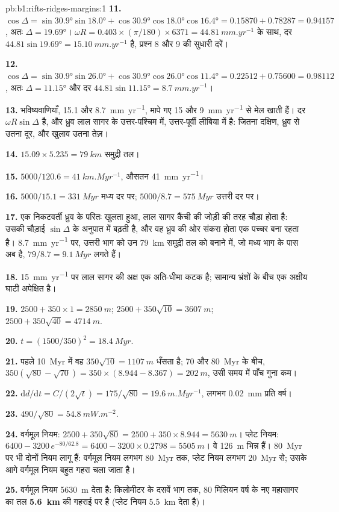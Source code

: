 \begin{solution}{pb:b1:rifts-ridges-margins:1}
\textbf{11.} $\cos\Delta = \sin\ang{30.9}\sin\ang{18.0} +
\cos\ang{30.9}\cos\ang{18.0}\cos\ang{16.4} = 0.15870 + 0.78287 = 0.94157$, अतः $\Delta = \ang{19.69}$। $\omega R = 0.403\times(\pi/180)\times6371 =
\qty{44.81}{mm.yr^{-1}}$ के साथ, दर $44.81\sin\ang{19.69} =
\qty{15.10}{mm.yr^{-1}}$ है, प्रश्न 8 और 9 की सुधारी दरें।

\textbf{12.} $\cos\Delta = \sin\ang{30.9}\sin\ang{26.0} +
\cos\ang{30.9}\cos\ang{26.0}\cos\ang{11.4} = 0.22512 + 0.75600 = 0.98112$, अतः $\Delta = \ang{11.15}$ और दर $44.81\sin\ang{11.15} =
\qty{8.7}{mm.yr^{-1}}$।

\textbf{13.} भविष्यवाणियाँ, 15.1 और \qty{8.7}{mm.yr^{-1}}, मापे गए 15 और \qty{9}{mm.yr^{-1}} से मेल खाती हैं। दर $\omega R\sin\Delta$ है, और ध्रुव लाल सागर के उत्तर-पश्चिम में, उत्तर-पूर्वी लीबिया में है: जितना दक्षिण, ध्रुव से उतना दूर, और खुलाव उतना तेज़।

\textbf{14.} $15.09\times5.235 = \qty{79}{km}$ समुद्री तल।

\textbf{15.} $5000/120.6 = \qty{41}{km.Myr^{-1}}$, औसतन \qty{41}{mm.yr^{-1}}।

\textbf{16.} $5000/15.1 = \qty{331}{Myr}$ मध्य दर पर; $5000/8.7 = \qty{575}{Myr}$ उत्तरी दर पर।

\textbf{17.} एक निकटवर्ती ध्रुव के परितः खुलता हुआ, लाल सागर कैंची की जोड़ी की तरह चौड़ा होता है: उसकी चौड़ाई $\sin\Delta$ के अनुपात में बढ़ती है, और वह ध्रुव की ओर संकरा होता एक पच्चर बना रहता है। \qty{8.7}{mm.yr^{-1}} पर, उत्तरी भाग को उन \qty{79}{km} समुद्री तल को बनाने में, जो मध्य भाग के पास अब है, $79/8.7 = \qty{9.1}{Myr}$ लगते हैं।

\textbf{18.} \qty{15}{mm.yr^{-1}} पर लाल सागर की अक्ष एक अति-धीमा कटक है; सामान्य भ्रंशों के बीच एक अक्षीय घाटी अपेक्षित है।

\textbf{19.} $2500 + 350\times1 = \qty{2850}{m}$;
$2500 + 350\sqrt{10} = \qty{3607}{m}$; $2500 + 350\sqrt{40} = \qty{4714}{m}$.

\textbf{20.} $t = (1500/350)^2 = \qty{18.4}{Myr}$.

\textbf{21.} पहले \qty{10}{Myr} में वह $350\sqrt{10} = \qty{1107}{m}$ धँसता है; 70 और \qty{80}{Myr} के बीच, $350(\sqrt{80} - \sqrt{70}) = 350\times(8.944 -
8.367) = \qty{202}{m}$, उसी समय में पाँच गुना कम।

\textbf{22.} $\mathrm dd/\mathrm dt = C/(2\sqrt t) = 175/\sqrt{80} =
\qty{19.6}{m.Myr^{-1}}$, लगभग \qty{0.02}{mm} प्रति वर्ष।

\textbf{23.} $490/\sqrt{80} = \qty{54.8}{mW.m^{-2}}$.

\textbf{24.} वर्गमूल नियम: $2500 + 350\sqrt{80} = 2500 + 350\times8.944 =
\qty{5630}{m}$। प्लेट नियम: $6400 - 3200\,e^{-80/62.8} = 6400 - 3200\times0.2798
= \qty{5505}{m}$। वे \qty{126}{m} भिन्न हैं। \qty{80}{Myr} पर भी दोनों नियम लागू हैं: वर्गमूल नियम लगभग \qty{80}{Myr} तक, प्लेट नियम लगभग \qty{20}{Myr} से; उसके आगे वर्गमूल नियम बहुत गहरा चला जाता है।

\textbf{25.} वर्गमूल नियम \qty{5630}{m} देता है: किलोमीटर के दसवें भाग तक, 80 मिलियन वर्ष के नए महासागर का तल
\textbf{\qty[text-series-to-math=true]{5.6}{km}} की गहराई पर है (प्लेट नियम \qty{5.5}{km} देता है)।
\end{solution}
